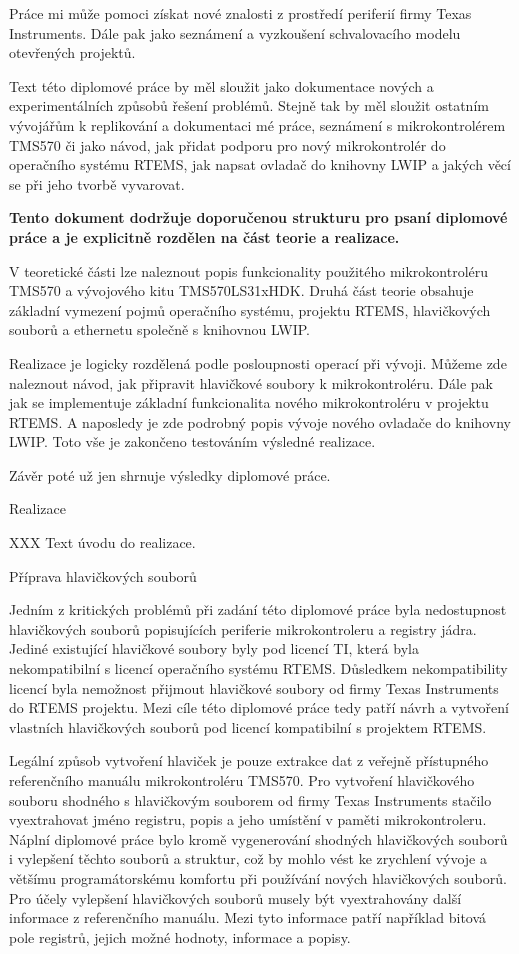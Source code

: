 Práce mi může pomoci získat nové znalosti z prostředí periferií firmy Texas Instruments.
Dále pak jako seznámení a vyzkoušení schvalovacího modelu otevřených projektů.

Text této diplomové práce by měl sloužit jako dokumentace nových a experimentálních způsobů řešení problémů.
Stejně tak by měl sloužit ostatním vývojářům k replikování a dokumentaci mé práce, seznámení s mikrokontrolérem TMS570 či jako návod, jak přidat podporu pro nový mikrokontrolér do operačního systému RTEMS, jak napsat ovladač do knihovny LWIP a jakých věcí se při jeho tvorbě vyvarovat.   

\medskip

{\bf
Tento dokument dodržuje doporučenou strukturu pro psaní diplomové práce a je explicitně rozdělen na část teorie a realizace.

V teoretické části lze naleznout popis funkcionality použitého mikrokontroléru TMS570 a vývojového kitu TMS570LS31xHDK.
Druhá část teorie obsahuje základní vymezení pojmů operačního systému, projektu RTEMS, hlavičkových souborů a ethernetu společně s knihovnou LWIP.

Realizace je logicky rozdělená podle posloupnosti operací při vývoji.
Můžeme zde naleznout návod, jak připravit hlavičkové soubory k mikrokontroléru.
Dále pak jak se implementuje základní funkcionalita nového mikrokontroléru v projektu RTEMS.
A naposledy je zde podrobný popis vývoje nového ovladače do knihovny LWIP.
Toto vše je zakončeno testováním výsledné realizace.

Závěr poté už jen shrnuje výsledky diplomové práce.}


\chap Realizace

XXX Text úvodu do realizace.

\sec Příprava hlavičkových souborů

	Jedním z kritických problémů při zadání této diplomové práce byla nedostupnost hlavičkových souborů popisujících periferie mikrokontroleru a registry jádra.
Jediné existující hlavičkové soubory byly pod licencí TI, která byla nekompatibilní s licencí operačního systému RTEMS.
Důsledkem nekompatibility licencí byla nemožnost přijmout hlavičkové soubory od firmy Texas Instruments do RTEMS projektu.
Mezi cíle této diplomové práce tedy patří návrh a vytvoření vlastních hlavičkových souborů pod licencí kompatibilní s projektem RTEMS.

Legální způsob vytvoření hlaviček je pouze extrakce dat z veřejně přístupného referenčního manuálu mikrokontroléru TMS570.
Pro vytvoření hlavičkového souboru shodného s hlavičkovým souborem od firmy Texas Instruments stačilo vyextrahovat jméno registru, popis a jeho umístění v paměti mikrokontroleru.
Náplní diplomové práce bylo kromě vygenerování shodných hlavičkových souborů i vylepšení těchto souborů a struktur, což by mohlo vést ke zrychlení vývoje a většímu programátorskému komfortu při používání nových hlavičkových souborů.
Pro účely vylepšení hlavičkových souborů musely být vyextrahovány další informace z referenčního manuálu.
Mezi tyto informace patří například bitová pole registrů, jejich možné hodnoty, informace a popisy.

